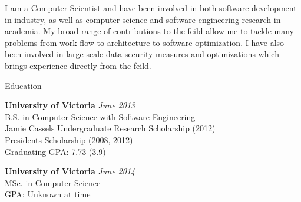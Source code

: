 \documentclass{resume} %
\begin{document}
I am a Computer Scientist and have been involved in both software development
in industry, as well as computer science and software engineering research
in academia. My broad range of contributions to the feild allow me to tackle
many problems from work flow to architecture to software optimization. I have
also been involved in large scale data security measures and optimizations which
brings experience directly from the feild.


\begin{rSection}{Education}

{\bf University of Victoria} \hfill {\em June 2013} \\ 
B.S. in Computer Science with Software Engineering \\
Jamie Cassels Undergraduate Research Scholarship (2012) \\
Presidents Scholarship (2008, 2012) \\
Graduating GPA: 7.73 (3.9)

{\bf University of Victoria} \hfill {\em June 2014} \\ 
MSc. in Computer Science\\
GPA: Unknown at time

\end{rSection}

\end{document}
